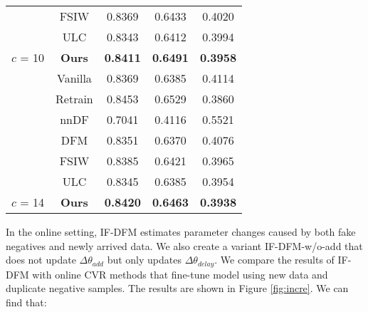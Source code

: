 \begin{table}[htbp]
\begin{tabular}{cc|ccc}
    \multicolumn{1}{c|}{}                                  & {FSIW}    & 0.8369                        & 0.6433                        & 0.4020                        \\
    \multicolumn{1}{c|}{}                                  & {ULC}     & 0.8343                        & 0.6412                        & 0.3994                        \\
    \multicolumn{1}{c|}{\multirow{-7}{*}{{$c$ = 10}}} & \textbf{Ours}    & \textbf{0.8411}               & \textbf{0.6491}               & \textbf{0.3958}               \\ \midrule
    \multicolumn{1}{c|}{}                                  & {Vanilla} & 0.8369                      & 0.6385                      & 0.4114                      \\ 
    \multicolumn{1}{c|}{}                                  & {Retrain} &  0.8453 &  0.6529 &  0.3860 \\\cline{2-5}
    \multicolumn{1}{c|}{}                                  & {nnDF}    & 0.7041                        & 0.4116                        & 0.5521                        \\
    \multicolumn{1}{c|}{}                                  & {DFM}     & 0.8351                        & 0.6370                        & 0.4076                        \\
    \multicolumn{1}{c|}{}                                  & {FSIW}    & 0.8385                        & 0.6421                        & 0.3965                        \\
    \multicolumn{1}{c|}{}                                  & {ULC}     & 0.8345                        & 0.6385                        & 0.3954                        \\
    \multicolumn{1}{c|}{\multirow{-7}{*}{{$c$ = 14}}} & \textbf{Ours}    & \textbf{0.8420}               & \textbf{0.6463}               & \textbf{0.3938} \\\bottomrule
\end{tabular}
\label{table:c}
\end{table}

In the online setting, IF-DFM estimates parameter changes caused by both fake negatives and newly arrived data. We also create a variant IF-DFM-w/o-add that does not update $\Delta{\theta_{add}}$ but only updates $\Delta{\theta_{delay}}$. We compare the results of IF-DFM with online CVR methods that fine-tune model using new data and duplicate negative samples. The results are shown in Figure \ref{fig:incre}. We can find that:

